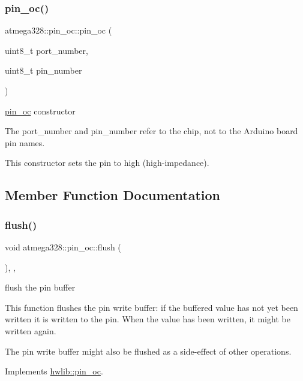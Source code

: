 \subsubsection{\texorpdfstring{pin\+\_\+oc()}{pin\_oc()}}
{\footnotesize\ttfamily atmega328\+::pin\+\_\+oc\+::pin\+\_\+oc (\begin{DoxyParamCaption}\item[{uint8\+\_\+t}]{port\+\_\+number,  }\item[{uint8\+\_\+t}]{pin\+\_\+number }\end{DoxyParamCaption})\hspace{0.3cm}{\ttfamily [inline]}}

\hyperlink{classatmega328_1_1pin__oc}{pin\+\_\+oc} constructor

The port\+\_\+number and pin\+\_\+number refer to the chip, not to the Arduino board pin names.

This constructor sets the pin to high (high-\/impedance). 

\subsection{Member Function Documentation}
\mbox{\label{classatmega328_1_1pin__oc_a3eb816793385d952d5fb00f473b07349}} 
\subsubsection{\texorpdfstring{flush()}{flush()}}
{\footnotesize\ttfamily void atmega328\+::pin\+\_\+oc\+::flush (\begin{DoxyParamCaption}{ }\end{DoxyParamCaption})\hspace{0.3cm}{\ttfamily [inline]}, {\ttfamily [override]}, {\ttfamily [virtual]}}





flush the pin buffer

This function flushes the pin write buffer\+: if the buffered value has not yet been written it is written to the pin. When the value has been written, it might be written again.

The pin write buffer might also be flushed as a side-\/effect of other operations. 

Implements \hyperlink{classhwlib_1_1pin__oc_a021036a4566c712e43250ddd28a85e54}{hwlib\+::pin\+\_\+oc}.

